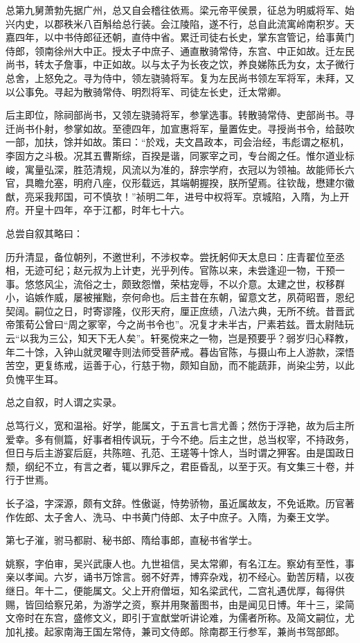 \documentclass[]{article}
\begin{document}
总第九舅萧勃先据广州，总又自会稽往依焉。梁元帝平侯景，征总为明威将军、始兴内史，以郡秩米八百斛给总行装。会江陵陷，遂不行，总自此流寓岭南积岁。天嘉四年，以中书侍郎征还朝，直侍中省。累迁司徒右长史，掌东宫管记，给事黄门侍郎，领南徐州大中正。授太子中庶子、通直散骑常侍，东宫、中正如故。迁左民尚书，转太子詹事，中正如故。以与太子为长夜之饮，养良娣陈氏为女，太子微行总舍，上怒免之。寻为侍中，领左骁骑将军。复为左民尚书领左军将军，未拜，又以公事免。寻起为散骑常侍、明烈将军、司徒左长史，迁太常卿。

后主即位，除祠部尚书，又领左骁骑将军，参掌选事。转散骑常侍、吏部尚书。寻迁尚书仆射，参掌如故。至德四年，加宣惠将军，量置佐史。寻授尚书令，给鼓吹一部，加扶，馀并如故。策曰：``於戏，夫文昌政本，司会治经，韦彪谓之枢机，李固方之斗极。况其五曹斯综，百揆是谐，同冢宰之司，专台阁之任。惟尔道业标峻，寓量弘深，胜范清规，风流以为准的，辞宗学府，衣冠以为领袖。故能师长六官，具瞻允塞，明府八座，仪形载远，其端朝握揆，朕所望焉。往钦哉，懋建尔徽猷，亮采我邦国，可不慎欤！''祯明二年，进号中权将军。京城陷，入隋，为上开府。开皇十四年，卒于江都，时年七十六。

总尝自叙其略曰：

历升清显，备位朝列，不邀世利，不涉权幸。尝抚躬仰天太息曰：庄青翟位至丞相，无迹可纪；赵元叔为上计吏，光乎列传。官陈以来，未尝逢迎一物，干预一事。悠悠风尘，流俗之士，颇致怨憎，荣枯宠辱，不以介意。太建之世，权移群小，谄嫉作威，屡被摧黜，奈何命也。后主昔在东朝，留意文艺，夙荷昭晋，恩纪契阔。嗣位之日，时寄谬隆，仪形天府，厘正庶绩，八法六典，无所不统。昔晋武帝策荀公曾曰``周之冢宰，今之尚书令也''。况复才未半古，尸素若兹。晋太尉陆玩云``以我为三公，知天下无人矣''。轩冕傥来之一物，岂是预要乎？弱岁归心释教，年二十馀，入钟山就灵曜寺则法师受菩萨戒。暮齿官陈，与摄山布上人游款，深悟苦空，更复练戒，运善于心，行慈于物，颇知自励，而不能蔬菲，尚染尘劳，以此负愧平生耳。

总之自叙，时人谓之实录。

总笃行义，宽和温裕。好学，能属文，于五言七言尤善；然伤于浮艳，故为后主所爱幸。多有侧篇，好事者相传讽玩，于今不绝。后主之世，总当权宰，不持政务，但日与后主游宴后庭，共陈暄、孔范、王瑳等十馀人，当时谓之狎客。由是国政日颓，纲纪不立，有言之者，辄以罪斥之，君臣昏乱，以至于灭。有文集三十卷，并行于世焉。

长子溢，字深源，颇有文辞。性傲诞，恃势骄物，虽近属故友，不免诋欺。历官著作佐郎、太子舍人、洗马、中书黄门侍郎、太子中庶子。入隋，为秦王文学。

第七子漼，驸马都尉、秘书郎、隋给事郎，直秘书省学士。

姚察，字伯审，吴兴武康人也。九世祖信，吴太常卿，有名江左。察幼有至性，事亲以孝闻。六岁，诵书万馀言。弱不好弄，博弈杂戏，初不经心。勤苦厉精，以夜继日。年十二，便能属文。父上开府僧垣，知名梁武代，二宫礼遇优厚，每得供赐，皆回给察兄弟，为游学之资，察并用聚蓄图书，由是闻见日博。年十三，梁简文帝时在东宫，盛修文义，即引于宣猷堂听讲论难，为儒者所称。及简文嗣位，尤加礼接。起家南海王国左常侍，兼司文侍郎。除南郡王行参军，兼尚书驾部郎。
\end{document}
